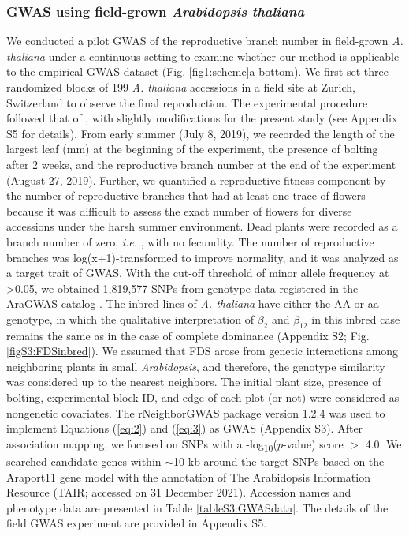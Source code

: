 \documentclass[12pt,]{article}
\begin{document}
\subsubsection{GWAS using field-grown \textit{Arabidopsis thaliana}}
We conducted a pilot GWAS of the reproductive branch number in field-grown \textit{A. thaliana} under a continuous setting to examine whether our method is applicable to the empirical GWAS dataset (Fig. \ref{fig1:scheme}a bottom). We first set three randomized blocks of 199 \textit{A. thaliana} accessions in a field site at Zurich, Switzerland to observe the final reproduction. The experimental procedure followed that of \cite{sato2019neighbor}, with slightly modifications for the present study (see Appendix S5 for details). From early summer (July 8, 2019), we recorded the length of the largest leaf (mm) at the beginning of the experiment, the presence of bolting after 2 weeks, and the reproductive branch number at the end of the experiment (August 27, 2019). Further, we quantified a reproductive fitness component by the number of reproductive branches that had at least one trace of flowers because it was difficult to assess the exact number of flowers for diverse accessions under the harsh summer environment. Dead plants were recorded as a branch number of zero, \textit{ i.e. }, with no fecundity. The number of reproductive branches was log(x+1)-transformed to improve normality, and it was analyzed as a target trait of GWAS. With the cut-off threshold of minor allele frequency at >0.05, we obtained 1,819,577 SNPs from genotype data registered in the AraGWAS catalog \citep{togninalli_aragwas_2018}. The inbred lines of \textit{A. thaliana} have either the AA or aa genotype, in which the qualitative interpretation of $\beta_2$ and $\beta_{12}$ in this inbred case remains the same as in the case of complete dominance (Appendix S2; Fig. \ref{figS3:FDSinbred}). We assumed that FDS arose from genetic interactions among neighboring plants in small \textit{Arabidopsis}, and therefore, the genotype similarity was considered up to the nearest neighbors. The initial plant size, presence of bolting, experimental block ID, and edge of each plot (or not) were considered as nongenetic covariates. The rNeighborGWAS package version 1.2.4 \citep{sato2019neighbor} was used to implement Equations (\ref{eq:2}) and (\ref{eq:3}) as GWAS (Appendix S3). After association mapping, we focused on SNPs with a -log\textsubscript{10}($p$-value) score $>$ 4.0. We searched candidate genes within $\sim$10 kb around the target SNPs based on the Araport11 gene model with the annotation of The Arabidopsis Information Resource (TAIR; accessed on 31 December 2021). Accession names and phenotype data are presented in Table \ref{tableS3:GWASdata}. The details of the field GWAS experiment are provided in Appendix S5.
\end{document}
